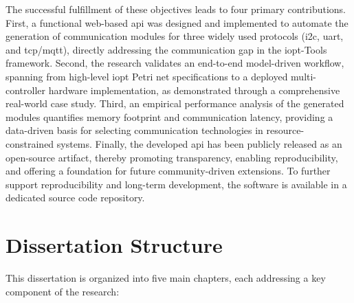 The successful fulfillment of these objectives leads to four primary contributions. First, a functional web-based \gls{api} was designed and implemented to automate the generation of communication modules for three widely used protocols (\gls{i2c}, \gls{uart}, and \gls{tcp}/\gls{mqtt}), directly addressing the communication gap in the \gls{iopt}-Tools framework. Second, the research validates an end-to-end model-driven workflow, spanning from high-level \gls{iopt} Petri net specifications to a deployed multi-controller hardware implementation, as demonstrated through a comprehensive real-world case study. Third, an empirical performance analysis of the generated modules quantifies memory footprint and communication latency, providing a data-driven basis for selecting communication technologies in resource-constrained systems. Finally, the developed \gls{api} has been publicly released as an open-source artifact, thereby promoting transparency, enabling reproducibility, and offering a foundation for future community-driven extensions. To further support reproducibility and long-term development, the software is available in a dedicated source code repository.


\section{Dissertation Structure}
\label{sec:dissertation_structure}


This dissertation is organized into five main chapters, each addressing a key component of the research:

